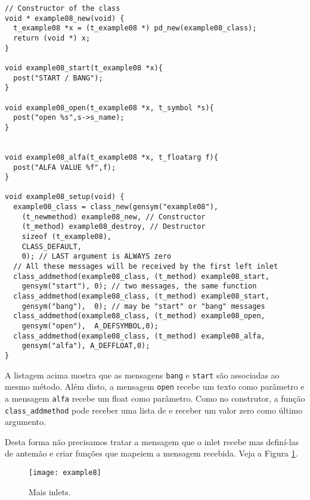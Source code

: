 \begin{lstlisting}[caption=Passagem de mensagens para o primeiro inlet]
// Constructor of the class
void * example08_new(void) {
  t_example08 *x = (t_example08 *) pd_new(example08_class);
  return (void *) x;
}

void example08_start(t_example08 *x){
  post("START / BANG");
}

void example08_open(t_example08 *x, t_symbol *s){
  post("open %s",s->s_name);
}


void example08_alfa(t_example08 *x, t_floatarg f){
  post("ALFA VALUE %f",f);
}

void example08_setup(void) {
  example08_class = class_new(gensym("example08"),
    (t_newmethod) example08_new, // Constructor
    (t_method) example08_destroy, // Destructor
    sizeof (t_example08),
    CLASS_DEFAULT,
    0); // LAST argument is ALWAYS zero
  // All these messages will be received by the first left inlet
  class_addmethod(example08_class, (t_method) example08_start, 
    gensym("start"), 0); // two messages, the same function
  class_addmethod(example08_class, (t_method) example08_start, 
    gensym("bang"),  0); // may be "start" or "bang" messages
  class_addmethod(example08_class, (t_method) example08_open,  
    gensym("open"),  A_DEFSYMBOL,0);
  class_addmethod(example08_class, (t_method) example08_alfa,  
    gensym("alfa"), A_DEFFLOAT,0); 
}
\end{lstlisting}

A listagem acima mostra que as mensagens \texttt{bang} e \texttt{start} são
associadas ao mesmo método.
Além disto, a mensagem \texttt{open} recebe um texto como parâmetro e a mensagem
\texttt{alfa} recebe um float como parâmetro.
Como no construtor, a função \texttt{class\_addmethod} pode receber uma lista de
e receber um valor zero como último argumento.

Desta forma não precisamos tratar a mensagem que o inlet recebe mas definí-las
de antemão e criar funções que mapeiem a mensagem recebida.
Veja a Figura \ref{fig:mais-inlets}.

\begin{figure}[h!]
\centering
\texttt{[image: example8]}
\caption{Mais inlets.}
\label{fig:mais-inlets}
\end{figure}

